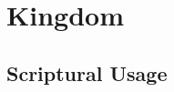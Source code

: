 \section{Kingdom}
	\label{KINGDOM}
	




	


\subsection{Scriptural Usage} %
	\label{KINGDOM-SCRIPTURES}

